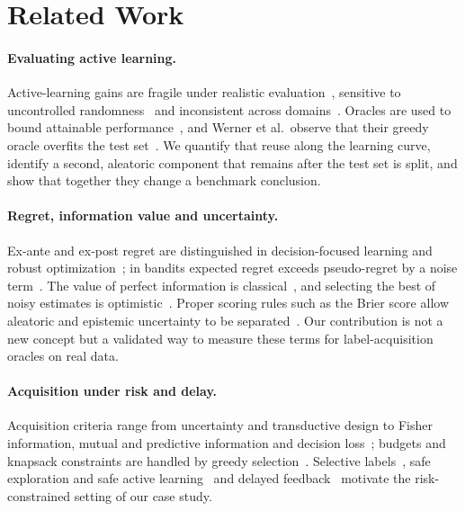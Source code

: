 \documentclass[runningheads]{llncs}
\begin{document}
\section{Related Work}
\label{sec:related}
\paragraph{Evaluating active learning.} Active-learning gains are fragile under realistic evaluation~\cite{luth2023navigating}, sensitive to uncontrolled randomness~\cite{ji2023randomness} and inconsistent across domains~\cite{werner2023comparable,werner2024cdalbench}. Oracles are used to bound attainable performance~\cite{werner2024cdalbench,huseljic2026boss}, and Werner et al.\ observe that their greedy oracle overfits the test set~\cite{werner2023comparable}. We quantify that reuse along the learning curve, identify a second, aleatoric component that remains after the test set is split, and show that together they change a benchmark conclusion.

\paragraph{Regret, information value and uncertainty.} Ex-ante and ex-post regret are distinguished in decision-focused learning and robust optimization~\cite{schutte2023robust}; in bandits expected regret exceeds pseudo-regret by a noise term~\cite{bubeck2012regret,audibert2010regret}. The value of perfect information is classical~\cite{howard1966information,raiffa1961applied}, and selecting the best of noisy estimates is optimistic~\cite{smith2006optimizer,cawley2010overfitting}. Proper scoring rules such as the Brier score allow aleatoric and epistemic uncertainty to be separated~\cite{hofman2024quantifying}. Our contribution is not a new concept but a validated way to measure these terms for label-acquisition oracles on real data.

\paragraph{Acquisition under risk and delay.} Acquisition criteria range from uncertainty and transductive design to Fisher information, mutual and predictive information and decision loss~\cite{cohn1996active,settles2009active,lewis1994sequential,yu2006transductive,ash2021fishing,kirsch2019batchbald,bickfordsmith2023prediction,huang2026loss,chaloner1995bayesian}; budgets and knapsack constraints are handled by greedy selection~\cite{krause2005near,sviridenko2004note,tomanek2010cost}. Selective labels~\cite{lakkaraju2017selective,wei2021selective,kilbertus2020fair,keswani2024partial,crook2004reject}, safe exploration and safe active learning~\cite{sui2015safe,schreiter2015safe,wu2016conservative} and delayed feedback~\cite{joulani2013delayed,chapelle2014delayed,pham2022latency} motivate the risk-constrained setting of our case study.
\end{document}
